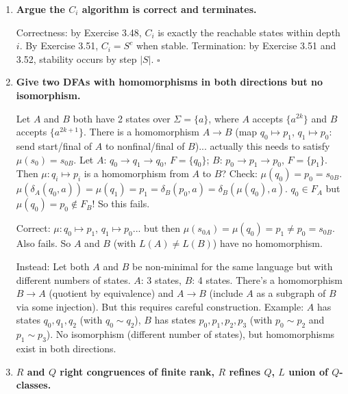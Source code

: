 \begin{enumerate}[{3.}1.]
Each strict inclusion $C_i\subsetneq C_{i+1}$ adds at least one new state. Starting from $|C_0|=1$, after at most $|S|-1$ strict inclusions we reach $C_{|S|-1}\supseteq\cdots$, which must equal $C_{|S|}$ (no room to grow beyond $|S|$ states). So $i\leq|S|-1\leq|S|$ and $C_i=S^c$. $\square$

\item \textbf{Argue the $C_i$ algorithm is correct and terminates.}

Correctness: by Exercise 3.48, $C_i$ is exactly the reachable states within depth $i$. By Exercise 3.51, $C_i=S^c$ when stable. Termination: by Exercise 3.51 and 3.52, stability occurs by step $|S|$. $\square$

\item \textbf{Give two DFAs with homomorphisms in both directions but no isomorphism.}

Let $A$ and $B$ both have 2 states over $\Sigma=\{a\}$, where $A$ accepts $\{a^{2k}\}$ and $B$ accepts $\{a^{2k+1}\}$. There is a homomorphism $A\to B$ (map $q_0\mapsto p_1$, $q_1\mapsto p_0$: send start/final of $A$ to nonfinal/final of $B$)... actually this needs to satisfy $\mu(s_0)=s_{0B}$. Let $A$: $q_0\to q_1\to q_0$, $F=\{q_0\}$; $B$: $p_0\to p_1\to p_0$, $F=\{p_1\}$. Then $\mu: q_i\mapsto p_i$ is a homomorphism from $A$ to $B$? Check: $\mu(q_0)=p_0=s_{0B}$. $\mu(\delta_A(q_0,a))=\mu(q_1)=p_1=\delta_B(p_0,a)=\delta_B(\mu(q_0),a)$. $q_0\in F_A$ but $\mu(q_0)=p_0\notin F_B$! So this fails.

Correct: $\mu: q_0\mapsto p_1$, $q_1\mapsto p_0$... but then $\mu(s_{0A})=\mu(q_0)=p_1\neq p_0=s_{0B}$. Also fails. So $A$ and $B$ (with $L(A)\neq L(B)$) have no homomorphism.

Instead: Let both $A$ and $B$ be non-minimal for the same language but with different numbers of states. $A$: 3 states, $B$: 4 states. There's a homomorphism $B\to A$ (quotient by equivalence) and $A\to B$ (include $A$ as a subgraph of $B$ via some injection). But this requires careful construction. Example: $A$ has states $q_0,q_1,q_2$ (with $q_0\sim q_2$), $B$ has states $p_0,p_1,p_2,p_3$ (with $p_0\sim p_2$ and $p_1\sim p_3$). No isomorphism (different number of states), but homomorphisms exist in both directions.

\item \textbf{$R$ and $Q$ right congruences of finite rank, $R$ refines $Q$, $L$ union of $Q$-classes.}


\end{enumerate}
